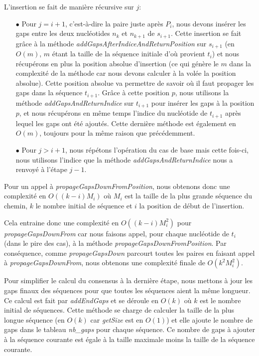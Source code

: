 L'insertion se fait de manière récursive sur $j$:
\begin{itemize}
	\item[$\bullet$] Pour $j = i + 1$, c'est-à-dire la paire juste après $P_{i}$, nous
		devons insérer les gaps entre les deux nucléotides $n_{k}$ et $n_{k +
		1}$ de $s_{i + 1}$. Cette insertion se fait grâce à la méthode
		\emph{addGapsAfterIndiceAndReturnPosition} sur $s_{i + 1}$ (en $O(m)$,
		$m$ étant la taille de la séquence initiale d'où provient $t_{i}$) et
		nous récupérons en plus la position absolue d'insertion (ce qui génère
		le $m$ dans la complexité de la méthode car nous devons calculer à la
		volée la position absolue). Cette position absolue va permettre de
		savoir où il faut propager les gaps dans la séquence $t_{i + 1}$. Grâce
		à cette position $p$, nous utilisons la méthode
		\emph{addGapsAndReturnIndice} sur $t_{i + 1}$ pour insérer les gaps à la
		position $p$, et nous récupérons en même temps l'indice du nucléotide de
		$t_{i + 1}$ après lequel les gaps ont été ajoutés. Cette dernière
		méthode est également en $O(m)$,
		toujours pour la même raison que précédemment.
	\item[$\bullet$] Pour $j > i + 1$, nous répétons l'opération du cas de base mais cette
		fois-ci, nous utilisons l'indice que la méthode
		\emph{addGapsAndReturnIndice} nous a renvoyé à l'étape $j - 1$.
\end{itemize}

Pour un appel à \emph{propageGapsDownFromPosition}, nous obtenons donc une
complexité en $O( (k - i) M_{i})$ où $M_{i}$ est la taille de la plus grande
séquence du chemin, $k$ le nombre initial de séquence et $i$ la position de
début de l'insertion.

Cela entraine donc une complexité en $O( (k - i) M_{i}^{2})$ pour
\emph{propageGapsDownFrom} car nous faisons appel, pour chaque nucléotide de
$t_{i}$ (dans le pire des cas), à la méthode \-\emph{propageGapsDownFromPosition}.
Par conséquence, comme \emph{propageGapsDown} parcourt toutes les paires en
faisant appel à \emph{propageGapsDownFrom}, nous obtenons une complexité finale de
$O(k^{2} M_{i}^{2})$.

Pour simplifier le calcul du consensus à la dernière étape, nous mettons à jour
les gaps finaux des séquences pour que toutes les séquences aient la même
longueur. Ce calcul est fait par \emph{addEndGaps} et se déroule en $O(k)$ où
$k$ est le nombre initial de séquences. Cette méthode se charge de calculer la
taille de la plus longue séquence (en $O(k)$ car \emph{getSize} est en $O(1)$)
et elle ajoute le nombre de gaps dans le tableau \emph{nb\_gaps} pour chaque
séquence. Ce nombre de gaps à ajouter à la séquence courante est égale à la
taille maximale moins la taille de la séquence courante.

